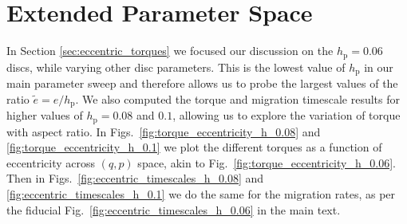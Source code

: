 \section{Extended Parameter Space}
\label{app:parameter_space}

In Section \ref{sec:eccentric_torques} we focused our discussion on the  $h_\textrm{p} = 0.06$ discs, while varying other disc parameters. This is the lowest value of $h_\textrm{p}$ in our main parameter sweep and therefore allows us to probe the largest values of the ratio $\tilde{e} = e/h_\textrm{p}$. We also computed the torque and migration timescale results for higher values of $h_\textrm{p} = 0.08$ and $0.1$, allowing us to explore the variation of torque with aspect ratio. In Figs.~\ref{fig:torque_eccentricity_h_0.08} and \ref{fig:torque_eccentricity_h_0.1} we plot the different torques as a function of eccentricity across $(q,p)$ space, akin to Fig.~\ref{fig:torque_eccentricity_h_0.06}. Then in Figs.~\ref{fig:eccentric_timescales_h_0.08} and \ref{fig:eccentric_timescales_h_0.1} we do the same for the migration rates, as per the fiducial Fig.~\ref{fig:eccentric_timescales_h_0.06} in the main text. 


